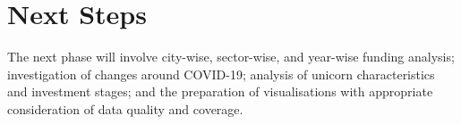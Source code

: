 \documentclass[10pt,a4paper]{article}
\begin{document}
\section{Next Steps}

The next phase will involve city-wise, sector-wise, and year-wise
funding analysis; investigation of changes around COVID-19;
analysis of unicorn characteristics and investment stages; and
the preparation of visualisations with appropriate consideration
of data quality and coverage.
\end{document}
